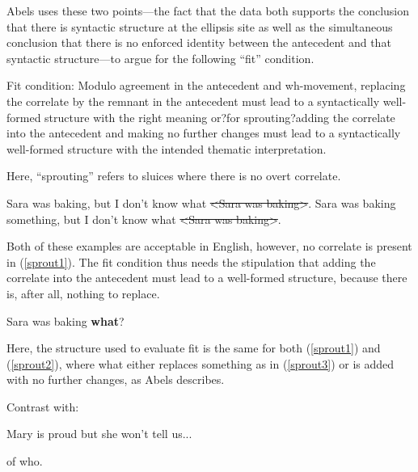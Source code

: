 \documentclass{turabian-researchpaper}
\begin{document}
Abels uses these two points---the fact that the data both supports the conclusion that there is syntactic structure at the ellipsis site as well as the simultaneous conclusion that there is no enforced identity between the antecedent and that syntactic structure---to argue for the following ``fit'' condition.  

\begin{exe}
\ex\label{fitcond} Fit condition: Modulo agreement in the antecedent and wh-movement, replacing the correlate by the remnant in the antecedent must lead to a syntactically well-formed structure with the right meaning or?for sprouting?adding the correlate into the antecedent and making no further changes must lead to a syntactically well-formed structure with the intended thematic interpretation. 
\end{exe}

Here, ``sprouting'' refers to sluices where there is no overt correlate. 

\begin{exe}
\ex
\begin{xlist}
\ex\label{sprout1} Sara was baking, but I don't know what \sout{\textless Sara was baking\textgreater}.
\ex\label{sprout2} Sara was baking something, but I don't know what \sout{\textless Sara was baking\textgreater}.
\end{xlist}
\end{exe} 

Both of these examples are acceptable in English, however, no correlate is present in (\ref{sprout1}). The fit condition thus needs the stipulation that adding the correlate into the antecedent must lead to a well-formed structure, because there is, after all, nothing to replace. 

\begin{exe}
\ex\label{sprout3} Sara was baking \textbf{what}? 
\end{exe}

Here, the structure used to evaluate fit is the same for both (\ref{sprout1}) and (\ref{sprout2}), where what either replaces something as in (\ref{sprout3}) or is added with no further changes, as Abels describes. 

Contrast with:
\begin{exe}
\ex\label{maryisproud} Mary is proud but she won't tell us...
\begin{xlist}
\ex of who.
\end{xlist}
\end{exe}
\end{document}
